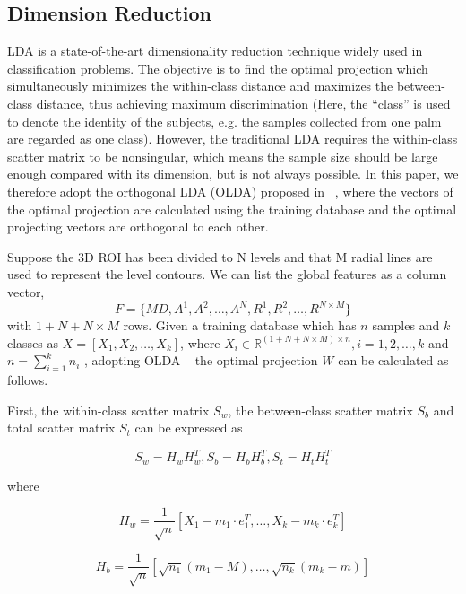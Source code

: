 \subsection{Dimension Reduction}
\label{ssec:methodology:lda}

LDA is a state-of-the-art dimensionality reduction technique widely used in classification problems. The objective is to find the optimal projection which simultaneously minimizes the within-class distance and maximizes the between-class distance, thus achieving maximum discrimination (Here, the “class” is used to denote the identity of the subjects, e.g. the samples collected from one palm are regarded as one class). However, the traditional LDA requires the within-class scatter matrix to be nonsingular, which means the sample size should be large enough compared with its dimension, but is not always possible. In this paper, we therefore adopt the orthogonal LDA (OLDA) proposed in ~\cite{[17]}, where the vectors of the optimal projection are calculated using the training database and the optimal projecting vectors are orthogonal to each other.

Suppose the 3D ROI has been divided to N levels and that M radial lines are used to represent the level contours. We can list the global features as a column vector,
\begin{equation}
F=\{MD,A^1,A^2,\dots,A^N,R^1,R^2,\dots,R^{N\times M}\}
\end{equation}
with $1+N+N\times M$ rows. Given a training database which has $n$ samples and $k$ classes as $X=[X_1,X_2,\dots,X_k]$, where $X_i \in \mathbb{R}^{(1+N+N\times M)\times n}, i=1,2,\dots,k$ and $n=\sum \limits_{i=1}^k n_i$ , adopting OLDA ~\cite{[17]} the optimal projection $W$ can be calculated as follows.

First, the within-class scatter matrix $S_w$, the between-class scatter matrix $S_b$ and total scatter matrix $S_t$ can be expressed as

\begin{equation}
S_w=H_w H_w^T, S_b=H_b H_b^T, S_t=H_t H_t^T
\end{equation}

where

\begin{equation}
H_w=\frac{1}{\sqrt{n}}\left[X_1 - m_1 \cdot e_1^T, \dots, X_k - m_k \cdot e_k^T \right]
\end{equation}

\begin{equation}
H_b=\frac{1}{\sqrt{n}}\left[\sqrt{n_1}(m_1-M),\dots,\sqrt{n_k}(m_k-m) \right]
\end{equation}

